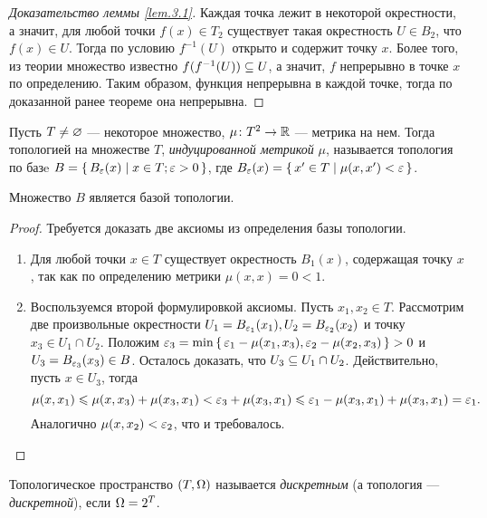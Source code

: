 \documentclass[main]{subfiles}
\begin{document}
\begin{proof}[Доказательство леммы \ref{lem.3.1}]
	Каждая точка лежит в некоторой окрестности, а значит, для любой точки $ f(x) \in T_2 $ существует такая
	окрестность $ U \in B_2 $, что $ f(x) \in U $. Тогда по условию $ f^{-1}(U) $ открыто и содержит точку $ x $.
	Более того, из теории множество известно $ f(f^{-1}(U)) \subseteq U $, а значит, $ f $ непрерывно в точке $ x $
	по определению. Таким образом, функция непрерывна в каждой точке, тогда по доказанной ранее теореме она
	непрерывна.
\end{proof}

\begin{definition}
	Пусть $ T \neq \varnothing $ --- некоторое множество, $ \mu \colon T^2 \to \mathbb{R} $ --- метрика на нем. Тогда
	топологией на множестве $ T $, \emph{индуцированной метрикой} $ \mu $, называется топология по базe
	$ B = \left\{\, B_\varepsilon(x) \mid x \in T; \varepsilon > 0 \,\right\} $, где $ B_\varepsilon(x) = \left\{\, x' \in T \mid \mu(x, x') < \varepsilon \,\right\} $.
\end{definition}

\begin{theorem}
	Множество $ B $ является базой топологии.
\end{theorem}

\begin{proof} Требуется доказать две аксиомы из определения базы топологии.
	\begin{enumerate}
		\item Для любой точки $ x \in T $ существует окрестность $ B_1(x) $, содержащая точку $ x $,
			так как по определению метрики $ \mu(x, x) = 0 < 1 $.
		\item Воспользуемся второй формулировкой аксиомы. Пусть $ x_1, x_2 \in T $. Рассмотрим две произвольные
			окрестности $ U_1 = B_{\varepsilon_1}(x_1), U_2 = B_{\varepsilon_2}(x_2) $ и точку $ x_3 \in U_1 \cap U_2 $. Положим
			$ \varepsilon_3 = \min \left\{\, \varepsilon_1 - \mu(x_1, x_3), \varepsilon_2 - \mu(x_2, x_3) \,\right\} > 0 $ и
			$ U_3 = B_{\varepsilon_3}(x_3) \in B $. Осталось доказать, что $ U_3 \subseteq U_1 \cap U_2 $. Действительно, пусть
			$ x \in U_3 $, тогда
			\[ \mu(x, x_1) \leqslant \mu(x, x_3) + \mu(x_3, x_1) < \varepsilon_3 + \mu(x_3, x_1) \leqslant
				\varepsilon_1 - \mu(x_3, x_1) + \mu(x_3, x_1 ) = \varepsilon_1. \]
			Аналогично $ \mu(x, x_2) < \varepsilon_2 $, что и требовалось.
	\end{enumerate}
\end{proof}

\begin{definition}
	Топологическое пространство $ (T, \Omega) $ называется \emph{дискретным} (а топология --- \emph{дискретной}),
	если $ \Omega = 2^T $.
\end{definition}
\end{document}
